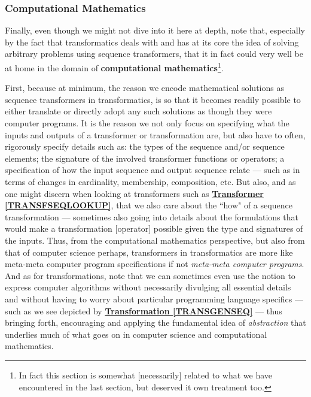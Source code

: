 \documentclass[a4paper, 18pt]{book} %
\begin{document}
\begin{appendices}
\vspace{2em}


\subsubsection{Computational Mathematics}
\label{SECCOMPMATH}



Finally, even though we might not dive into it here at depth, note that, especially by the fact that transformatics deals with and has at its core the idea of solving arbitrary problems using sequence transformers, that it in fact could very well be at home in the domain of \textbf{computational mathematics}\footnote{In fact this section is somewhat [necessarily] related to what we have encountered in the last section, but deserved it own treatment too.}.

\vspace{2em}

First, because at minimum, the reason we encode mathematical solutions as sequence transformers in transformatics, is so that it becomes readily possible to either translate or directly adopt any such solutions as though they were computer programs. It is the reason we not only focus on specifying what the inputs and outputs of a transformer or transformation are, but also have to often, rigorously specify details such as: the types of the sequence and/or sequence elements; the signature of the involved transformer functions or operators; a specification of how the input sequence and output sequence relate --- such as in terms of changes in cardinality, membership, composition, etc. But also, and as one might discern when looking at transformers such as \textbf{\hyperref[TRANSFSEQLOOKUP]{Transformer \ref{TRANSFSEQLOOKUP}}}, that we also care about the ``how" of a sequence transformation --- sometimes also going into details about the formulations that would make a transformation [operator] possible given the type and signatures of the inputs. Thus, from the computational mathematics perspective, but also from that of computer science perhaps, transformers in transformatics are more like meta-meta computer program specifications if not \textit{meta-meta computer programs}. And as for transformations, note that we can sometimes even use the notion to express computer algorithms without necessarily divulging all essential details and without having to worry about particular programming language specifics --- such as we see depicted by \textbf{\hyperref[TRANSGENSEQ]{Transformation \ref{TRANSGENSEQ}}} --- thus bringing forth, encouraging and applying the fundamental idea of \textit{abstraction} that underlies much of what goes on in computer science and computational mathematics.


\end{appendices}
\end{document}
